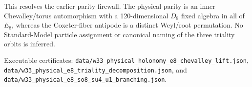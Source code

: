 This resolves the earlier parity firewall. The physical parity is an inner
Chevalley/torus automorphism with a 120-dimensional \(D_8\) fixed algebra in
all of \(E_8\), whereas the Coxeter-fiber antipode is a distinct Weyl/root
permutation. No Standard-Model particle assignment or canonical naming of the
three triality orbits is inferred.

Executable certificates:
\texttt{data/w33\_physical\_holonomy\_e8\_chevalley\_lift.json},
\texttt{data/w33\_physical\_e8\_triality\_decomposition.json}, and
\texttt{data/w33\_physical\_e8\_so8\_su4\_u1\_branching.json}.